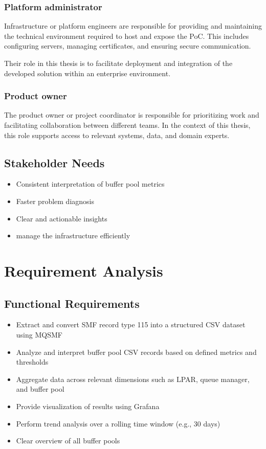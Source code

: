 \subsubsection{Platform administrator}
Infrastructure or platform engineers are responsible for providing and maintaining the technical environment required to host and expose the PoC. This includes configuring servers, managing certificates, and ensuring secure communication.

Their role in this thesis is to facilitate deployment and integration of the developed solution within an enterprise environment.
\subsubsection{Product owner}
The product owner or project coordinator is responsible for prioritizing work and facilitating collaboration between different teams. In the context of this thesis, this role supports access to relevant systems, data, and domain experts.


\subsection{Stakeholder Needs}
\begin{itemize}
    \item Consistent interpretation of buffer pool metrics
    \item Faster problem diagnosis
    \item Clear and actionable insights
    \item manage the infrastructure efficiently 
\end{itemize}

\section{Requirement Analysis}

\subsection{Functional Requirements}
\begin{itemize}
    \item Extract and convert SMF record type 115 into a structured CSV dataset using MQSMF 
    \item Analyze and interpret buffer pool CSV records based on defined metrics and thresholds
    \item Aggregate data across relevant dimensions such as LPAR, queue manager, and buffer pool
    \item Provide visualization of results using Grafana
    \item Perform trend analysis over a rolling time window (e.g., 30 days)
    \item Clear overview of all buffer pools
\end{itemize}

